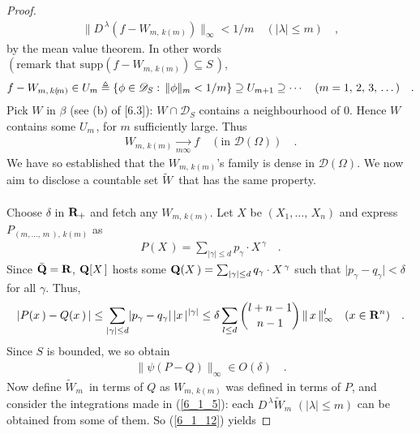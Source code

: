 \begin{proof}
\begin{align}\label{6_1_7}
\|D^{\, \lambda } (f   -W_{m,\, k(\!m)}  )  \|_\infty < 1/m \quad ( \lvert \lambda \rvert \leq m )\quad ,
\end{align}
by the mean value theorem. In other words $(\text{remark that }\text{supp} (f   -W_{m,\, k(\!m)}) \subseteq S\,)$,  
\begin{align}\label{6_1_8}
f- W_{m,\, k(\!m)}  \in U_m \triangleq \{ \phi \in \mathscr{D}_S :\, \| \phi \|_m< 1/m \} \supseteq  U_{m+1}\supseteq  \dotsb \quad( m=1,\, 2,\, 3,\, \dots) \quad  .
\end{align}
Pick $W$ in $\beta$ (see (b) of [6.3]): $W\cap\mathscr{D}_S$ contains a neighbourhood of $0$. Hence $W$ contains some $U_{m\,}$, for $m$ sufficiently large. Thus 
\begin{align}\label{6_1_9}
W_{m,\, k(\!m) } \underset{m\infty} {\longrightarrow} f  \quad  (\text{in } \mathscr{D}(\Omega))\quad .
\end{align}
We have so established that the $W_{m,\, k(\!m)}$'s family is dense in $\mathscr{D}(\Omega)$. We now aim to disclose a  countable set $\tilde{W}\,$ that has the same property.\\
\\
Choose $\delta $ in ${\mathbf R}_+$ and fetch any $W_{m,\, k(\!m)}$. Let $X$ be $(X_1,\dotsc,\, X_n)$ and express $P_{(m,\dotsc,\, m\,),\, k(\!m)}$ as 
\begin{align}\label{6_1_10}
P(X\,)=\sum_{\lvert \gamma \rvert \leq d} p_\gamma \cdot X^{\,\gamma} \quad  .
\end{align}
Since $\bar{{\mathbf Q}}={\mathbf R}$, ${\mathbf Q}[X\,]$ hosts some ${{\mathbf Q}(X\,)=\sum_{\lvert \gamma \rvert \leq d} q_\gamma \cdot X^{\,\gamma}}$ such that $\lvert p_\gamma - q_\gamma\rvert < \delta\,$ for all $\gamma$. Thus,
\begin{align}\label{6_1_11}
\lvert P(x\,)-Q(x\,) \,\rvert \leq   \sum_{\lvert \gamma \rvert \leq d} \lvert p_\gamma-q_\gamma\rvert\, \lvert x\,\rvert^{\lvert \gamma\rvert} \leq \delta \sum_{l  \leq d} \binom{l+n-1}{n-1}\, \| \, x\, \|^{l}_\infty \quad (x\in {\mathbf R}^n)\quad .
\end{align}
Since $S$ is bounded, we so obtain
\begin{align}\label{6_1_12}
 \|\psi (P- Q) \|_\infty  \in O(\delta) \quad .
\end{align}
Now define $\tilde{W}_m\,$ in terms of $Q$ as $W_{m,\, k(\!m)}$ was defined in terms of $P$, and consider the integrations made in (\ref{6_1_5}): each $D^{\,\lambda} \tilde{W}_m\,\, (\lvert \lambda \rvert\leq m)$ can be obtained from some of them. So (\ref{6_1_12}) yields

\end{proof}

